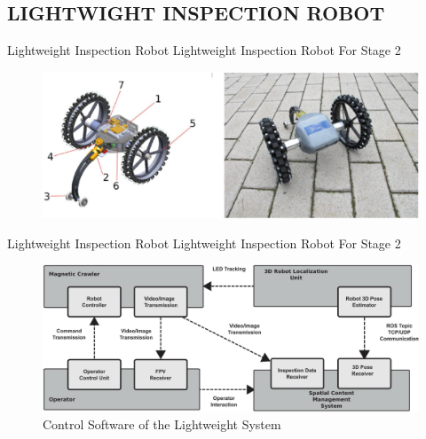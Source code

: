 \documentclass{beamer}
\begin{document}
            \subsection{LIGHTWIGHT INSPECTION ROBOT}
            \begin{frame}{Lightweight Inspection Robot}
                \centering
                Lightweight Inspection Robot For Stage 2
                    \begin{figure}[htb]
                        \centering
                        \includegraphics[scale=0.2]{figuras/lightweight_crawler.png}                   
                        \label{}
                        
                    \end{figure}                 
            \end{frame} 

            \begin{frame}{Lightweight Inspection Robot}
                \centering
                Lightweight Inspection Robot For Stage 2 
                    \begin{figure}[htb]
                        \centering
                        \includegraphics[scale=0.15]{figuras/overview_of_the_control_software_of_the_lightweight_system.png}                   
                        \label{}
                        Control Software of the Lightweight System
                    \end{figure} 
            \end{frame}        
            
\end{document}
